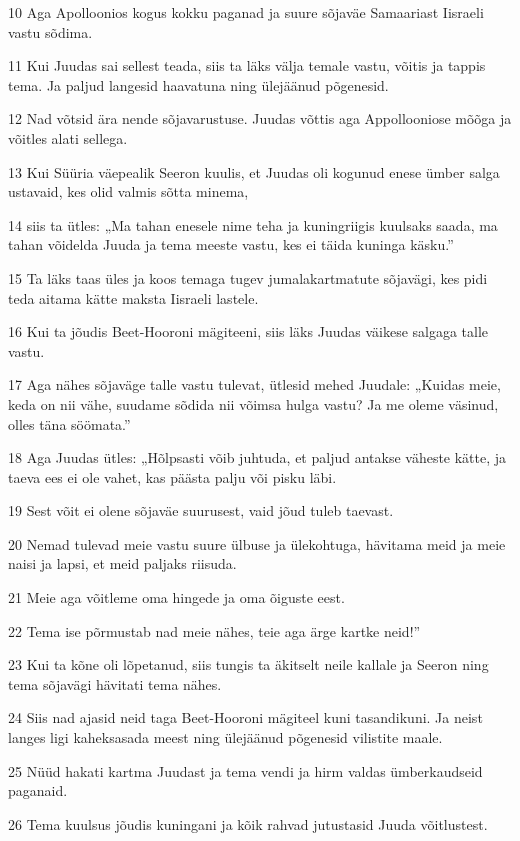 \par 10 Aga Apolloonios kogus kokku paganad ja suure sõjaväe Samaariast Iisraeli vastu sõdima.
\par 11 Kui Juudas sai sellest teada, siis ta läks välja temale vastu, võitis ja tappis tema. Ja paljud langesid haavatuna ning ülejäänud põgenesid.
\par 12 Nad võtsid ära nende sõjavarustuse. Juudas võttis aga Appollooniose mõõga ja võitles alati sellega.
\par 13 Kui Süüria väepealik Seeron kuulis, et Juudas oli kogunud enese ümber salga ustavaid, kes olid valmis sõtta minema,
\par 14 siis ta ütles: „Ma tahan enesele nime teha ja kuningriigis kuulsaks saada, ma tahan võidelda Juuda ja tema meeste vastu, kes ei täida kuninga käsku.”
\par 15 Ta läks taas üles ja koos temaga tugev jumalakartmatute sõjavägi, kes pidi teda aitama kätte maksta Iisraeli lastele.
\par 16 Kui ta jõudis Beet-Hooroni mägiteeni, siis läks Juudas väikese salgaga talle vastu.
\par 17 Aga nähes sõjaväge talle vastu tulevat, ütlesid mehed Juudale: „Kuidas meie, keda on nii vähe, suudame sõdida nii võimsa hulga vastu? Ja me oleme väsinud, olles täna söömata.”
\par 18 Aga Juudas ütles: „Hõlpsasti võib juhtuda, et paljud antakse väheste kätte, ja taeva ees ei ole vahet, kas päästa palju või pisku läbi.
\par 19 Sest võit ei olene sõjaväe suurusest, vaid jõud tuleb taevast.
\par 20 Nemad tulevad meie vastu suure ülbuse ja ülekohtuga, hävitama meid ja meie naisi ja lapsi, et meid paljaks riisuda.
\par 21 Meie aga võitleme oma hingede ja oma õiguste eest.
\par 22 Tema ise põrmustab nad meie nähes, teie aga ärge kartke neid!”
\par 23 Kui ta kõne oli lõpetanud, siis tungis ta äkitselt neile kallale ja Seeron ning tema sõjavägi hävitati tema nähes.
\par 24 Siis nad ajasid neid taga Beet-Hooroni mägiteel kuni tasandikuni. Ja neist langes ligi kaheksasada meest ning ülejäänud põgenesid vilistite maale.
\par 25 Nüüd hakati kartma Juudast ja tema vendi ja hirm valdas ümberkaudseid paganaid.
\par 26 Tema kuulsus jõudis kuningani ja kõik rahvad jutustasid Juuda võitlustest. 


